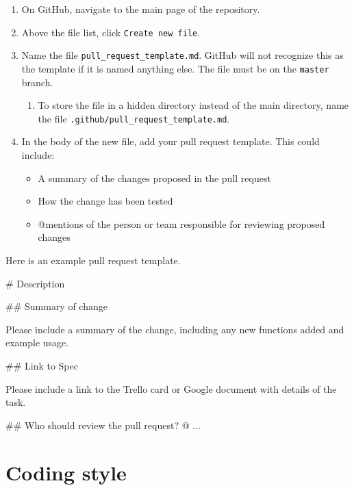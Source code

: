 \documentclass[
]{book}
\newenvironment{Shaded}{\begin{snugshade}}{\end{snugshade}}
\newcommand{\NormalTok}[1]{#1}
\providecommand{\tightlist}{%
  \setlength{\itemsep}{0pt}\setlength{\parskip}{0pt}}
\begin{document}
\begin{enumerate}
\def\labelenumi{\arabic{enumi}.}
\tightlist
\item
  On GitHub, navigate to the main page of the repository.
\item
  Above the file list, click \texttt{Create\ new\ file}.
\item
  Name the file \texttt{pull\_request\_template.md}. GitHub will not recognize this as the template if it is named anything else. The file must be on the \texttt{master} branch.

  \begin{enumerate}
  \def\labelenumii{\arabic{enumii}.}
  \tightlist
  \item
    To store the file in a hidden directory instead of the main directory, name the file \texttt{.github/pull\_request\_template.md}.
  \end{enumerate}
\item
  In the body of the new file, add your pull request template. This could include:

  \begin{itemize}
  \tightlist
  \item
    A summary of the changes proposed in the pull request
  \item
    How the change has been tested
  \item
    @mentions of the person or team responsible for reviewing proposed changes
  \end{itemize}
\end{enumerate}

Here is an example pull request template.

\begin{Shaded}
\begin{Highlighting}[]
\NormalTok{\# Description}

\NormalTok{\#\# Summary of change}

\NormalTok{Please include a summary of the change, including any new functions added and example usage. }

\NormalTok{\#\# Link to Spec}

\NormalTok{Please include a link to the Trello card or Google document with details of the task. }

\NormalTok{\#\# Who should review the pull request?}
\NormalTok{@ ...}
\end{Highlighting}
\end{Shaded}

\chapter{Coding style}\label{coding-style}
\end{document}
